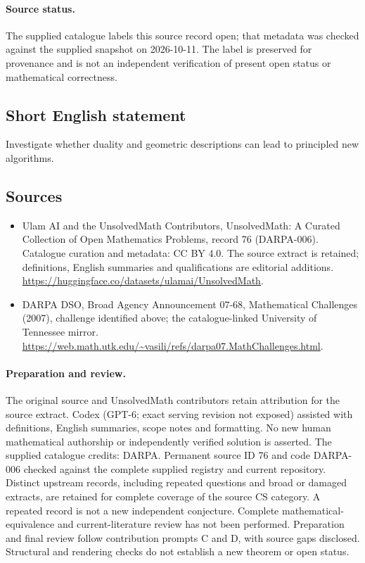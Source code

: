 \documentclass[11pt]{article}
\begin{document}
\paragraph{Source status.}
The supplied catalogue labels this source record open; that metadata was checked against the supplied snapshot on 2026-10-11. The label is preserved for provenance and is not an independent verification of present open status or mathematical correctness.
\subsection{Short English statement}
Investigate whether duality and geometric descriptions can lead to principled new algorithms.
\subsection{Sources}
\begin{itemize}
\item[\hypertarget{source:76:1}{S1}] Ulam AI and the UnsolvedMath Contributors, UnsolvedMath: A Curated Collection of Open Mathematics Problems, record 76 (DARPA-006). Catalogue curation and metadata: CC BY 4.0. The source extract is retained; definitions, English summaries and qualifications are editorial additions.
\url{https://huggingface.co/datasets/ulamai/UnsolvedMath}.
\item[\hypertarget{source:76:2}{S2}] DARPA DSO, Broad Agency Announcement 07-68, Mathematical Challenges (2007), challenge identified above; the catalogue-linked University of Tennessee mirror.
\url{https://web.math.utk.edu/~vasili/refs/darpa07.MathChallenges.html}.
\end{itemize}
\paragraph{Preparation and review.}
The original source and UnsolvedMath contributors retain attribution for the source extract. Codex (GPT-6; exact serving revision not exposed) assisted with definitions, English summaries, scope notes and formatting. No new human mathematical authorship or independently verified solution is asserted. The supplied catalogue credits: DARPA. Permanent source ID 76 and code DARPA-006 checked against the complete supplied registry and current repository. Distinct upstream records, including repeated questions and broad or damaged extracts, are retained for complete coverage of the source CS category. A repeated record is not a new independent conjecture. Complete mathematical-equivalence and current-literature review has not been performed. Preparation and final review follow contribution prompts C and D, with source gaps disclosed. Structural and rendering checks do not establish a new theorem or open status.
\label{end:76}
\end{document}

